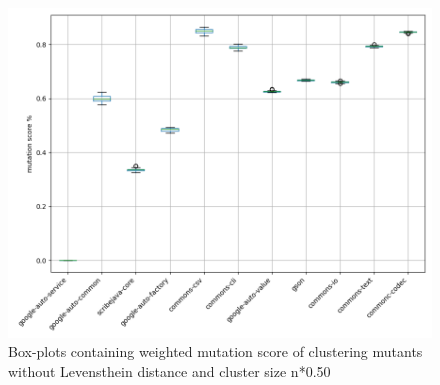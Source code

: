 \documentclass[conference,draftclsnofoot,onecolumn]{IEEEtran}
\begin{document}
\begin{figure}[ht]
\includegraphics[width=0.5 \textwidth]{images/boxplot_summary/boxplot_hc_no_distance_0.5.png}
\caption{\label{box:clustering_no_distance_50}Box-plots containing weighted mutation score of clustering mutants without Levensthein distance and cluster size n*0.50}
\end{figure}
\end{document}
